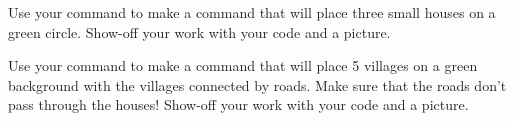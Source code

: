 \documentclass[noauthor,nooutcomes,12pt]{ximera}
\begin{document}
\newpage

\begin{problem}
  Use your command  to make a command  that will
  place three small houses on a green circle. Show-off your work with
  your code and a picture.
\end{problem}

\newpage

\begin{problem}
  Use your command  to make a command  that
  will place 5 villages on a green background with the villages
  connected by roads. Make sure that the roads don't pass through the
  houses! Show-off your work with your code and a picture.
\end{problem}
\end{document}
